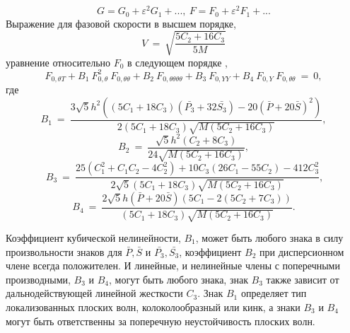 \[
G = G_0 + \varepsilon^2 G_1+...,~F = F_0+\varepsilon^2 F_1+...
\]
Выражение для фазовой скорости в высшем порядке,
\begin{equation}
    V~=~\sqrt{\frac{5 C_2 + 16 C_3}{5 M}}
\end{equation}
уравнение относительно $F_0$ в следующем порядке \cite{PorOsAnt2020},
\begin{equation}
	F_{0,\theta T}+ B_1~ F_{0,\theta}^2~ F_{0,\theta \theta} +B_2 ~F_{0,\theta \theta \theta \theta}+ B_3~ F_{0,Y Y}+B_4~F_{0,Y}~ F_{0,\theta \theta}~=~0, \label{kpsh}
\end{equation}
где
\[
B_1~=~\frac{3 \sqrt{5} h^2 \left((5 C_1 +18 C_3)(\bar{P_3}+32 \bar{S_3})-20 (\bar{P}+20 \bar{S})^2 \right)}{2 (5 C_1+18 C_3) \sqrt{M (5 C_2+16 C_3)}},
\]
\[
B_2~=~\frac{\sqrt{5} h^2 (C_2+8 C_3)}{24 \sqrt{M (5 C_2+16 C_3)}},
\]
\[
~B_3~=~\frac{25 \left(C_1^2+C_1 C_2-4 C_2^2\right)+10 C_3 (26 C_1-55 C_2)-412 C_3^2}
{2 \sqrt{5} (5 C_1+18 C_3) \sqrt{M (5 C_2+16 C_3)}},
\]
\[
B_4~=~\frac{2 \sqrt{5} h (\bar{P}+20 \bar{S}) (5 C_1-2 (5 C_2+7 C_3))}{(5 C_1+18 C_3) \sqrt{M (5 C_2+16 C_3)}}.
\]

Коэффициент кубической нелинейности, $ B_1 $, может быть любого знака в силу произвольности знаков для $ \bar {P}, \bar{S} $ и $ \bar {P_3}, \bar {S_3} $, коэффициент $ B_2 $ при дисперсионном члене всегда положителен. И линейные, и нелинейные члены с поперечными производными, $ B_3 $ и $ B_4 $, могут быть любого знака, знак $ B_3 $ также зависит от дальнодействующей линейной жесткости $ C_3 $. Знак $ B_1 $ определяет тип локализованных плоских волн, колоколообразный или кинк, а знаки $ B_3 $ и $ B_4 $ могут быть ответственны за поперечную неустойчивость плоских волн.


